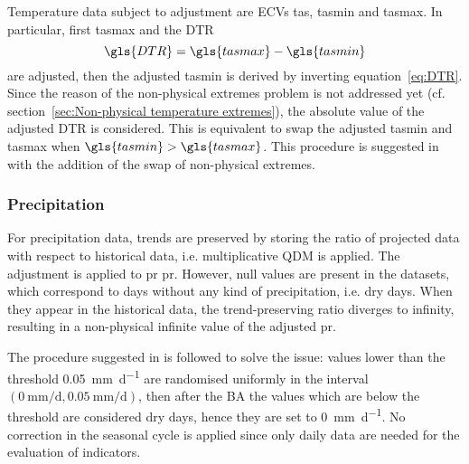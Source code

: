 Temperature data subject to adjustment are \glspl{ECV} \gls{tas}, \gls{tasmin} and \gls{tasmax}. In particular, first \gls{tasmax} and the \glsdesc{DTR}
\begin{equation}
  \label{eq:DTR}
  \gls{DTR} = \gls{tasmax} - \gls{tasmin}
\end{equation}
are adjusted, then the adjusted \gls{tasmin} is derived by inverting equation~\eqref{eq:DTR}. Since the reason of the non-physical extremes problem is not addressed yet (cf. section~\ref{sec:Non-physical temperature extremes}), the absolute value of the adjusted \gls{DTR} is considered. This is equivalent to swap the adjusted \gls{tasmin} and \gls{tasmax} when $\gls{tasmin} > \gls{tasmax}$.
This procedure is suggested in \cite[3313]{2012ThrasherTechnicalNote} with the addition of the swap of non-physical extremes.



\subsubsection{Precipitation}
For precipitation data, trends are preserved by storing the ratio of projected data with respect to historical data, i.e. multiplicative \gls{QDM} is applied.
The adjustment is applied to \glsdesc{pr} \gls{pr}. However, null values are present in the datasets, which correspond to days without any kind of precipitation, i.e. dry days. When they appear in the historical data, the trend-preserving ratio diverges to infinity, resulting in a non-physical infinite value of the adjusted \gls{pr}.

The procedure suggested in \cite[6945]{2015CannonBiasCorrection} is followed to solve the issue: values lower than the threshold \qty{0.05}{\milli\metre\per\day} are randomised uniformly in the interval $(\qty{0}{\milli\metre\per\day}, \qty{0.05}{\milli\metre\per\day})$, then after the \gls{BA} the values which are below the threshold are considered dry days, hence they are set to \qty{0}{\milli\metre\per\day}. No correction in the seasonal cycle is applied since only daily data are needed for the evaluation of \glspl{indicator}.



